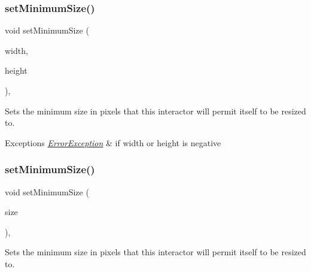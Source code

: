 \mbox{\label{classGInteractor_a0cf428e207b7f22cc08138a90b1b87b2}} 
\subsubsection{\texorpdfstring{set\+Minimum\+Size()}{setMinimumSize()}\hspace{0.1cm}{\footnotesize\ttfamily [1/2]}}
{\footnotesize\ttfamily void set\+Minimum\+Size (\begin{DoxyParamCaption}\item[{double}]{width,  }\item[{double}]{height }\end{DoxyParamCaption})\hspace{0.3cm}{\ttfamily [virtual]}, {\ttfamily [inherited]}}



Sets the minimum size in pixels that this interactor will permit itself to be resized to. 


\begin{DoxyExceptions}{Exceptions}
{\em \mbox{\hyperlink{classErrorException}{Error\+Exception}}} & if width or height is negative \\
\hline
\end{DoxyExceptions}
\mbox{\label{classGInteractor_a3b1046117ac6cb7abe467e00ba8a81f4}} 
\subsubsection{\texorpdfstring{set\+Minimum\+Size()}{setMinimumSize()}\hspace{0.1cm}{\footnotesize\ttfamily [2/2]}}
{\footnotesize\ttfamily void set\+Minimum\+Size (\begin{DoxyParamCaption}\item[{const \mbox{\hyperlink{classGDimension}{G\+Dimension}} \&}]{size }\end{DoxyParamCaption})\hspace{0.3cm}{\ttfamily [virtual]}, {\ttfamily [inherited]}}



Sets the minimum size in pixels that this interactor will permit itself to be resized to. 


